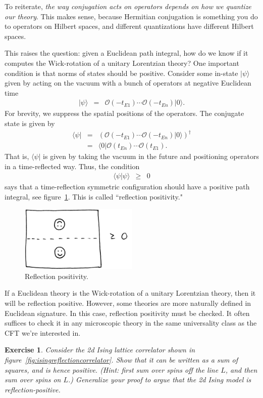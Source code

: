 \documentclass[11pt]{ws-rv9x6}
\newcommand\be{\begin{eqnarray}}
\newcommand\ee{\end{eqnarray}}
\newcommand\cO{\mathcal{O}}
\newcommand\<\langle
\renewcommand\>\rangle
\newcommand\nn{\nonumber}
\renewcommand\.{\cdot}
\newtheorem{exercise}{Exercise}[section]
\begin{document}
To reiterate, {\it the way conjugation acts on operators depends on how we quantize our theory}.  This makes sense, because Hermitian conjugation is something you do to operators on Hilbert spaces, and different quantizations have different Hilbert spaces.

This raises the question: given a Euclidean path integral, how do we know if it computes the Wick-rotation of a unitary Lorentzian theory?  One important condition is that norms of states should be positive.  Consider some in-state $|\psi\>$ given by acting on the vacuum with a bunch of operators at negative Euclidean time
\be
|\psi\> &=& \cO(-t_{E1})\cdots\cO(-t_{En})|0\>.
\ee
For brevity, we suppress the spatial positions of the operators.
The conjugate state is given by
\be
\<\psi| &=& (\cO(-t_{E1})\cdots\cO(-t_{En})|0\>)^\dag \nn \\
&=& \<0|\cO(t_{En})\cdots\cO(t_{E1}).
\ee
That is, $\<\psi|$ is given by taking the vacuum in the future and positioning operators in a time-reflected way.  Thus, the condition
\be
\<\psi|\psi\> &\geq& 0
\ee
says that a time-reflection symmetric configuration should have a positive path integral, see figure~\ref{fig:reflectionpositivity}.  This is called ``reflection positivity."

\begin{figure}
\begin{center}
\includegraphics[width=0.5\textwidth]{reflectionpositivity.jpg}
\end{center}
\caption{Reflection positivity.  \label{fig:reflectionpositivity}}
\end{figure}

If a Euclidean theory is the Wick-rotation of a unitary Lorentzian theory, then it will be reflection positive.  However, some theories are more naturally defined in Euclidean signature.  In this case, reflection positivity must be checked.  It often suffices to check it in any microscopic theory in the same universality class as the CFT we're interested in.
\begin{exercise}
Consider the 2d Ising lattice correlator shown in figure~\ref{fig:isingreflectioncorrelator}.  Show that it can be written as a sum of squares, and is hence positive. (Hint: first sum over spins off the line $L$, and then sum over spins on $L$.) Generalize your proof to argue that the 2d Ising model is reflection-positive.
\end{exercise}
\end{document}
